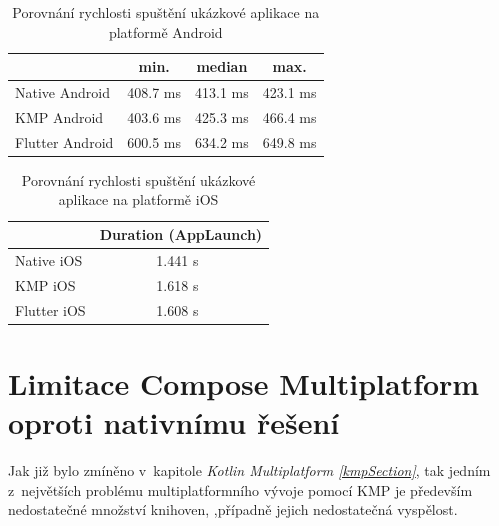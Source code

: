 \begin{table}[H]
  \centering
  \caption{Porovnání rychlosti spuštění ukázkové aplikace na platformě Android}
  \begin{tabular}{|l|c|c|c|}
    \hline
       & min. & median & max. \\ \hline 
      Native Android & 408.7 ms & 413.1 ms & 423.1 ms \\
      KMP Android & 403.6 ms & 425.3 ms & 466.4 ms \\
      Flutter Android & 600.5 ms & 634.2 ms & 649.8 ms \\ \hline
  \end{tabular}
  \label{tab:performance_comparison}
\end{table}

\begin{table}[H]
  \centering
  \caption{Porovnání rychlosti spuštění ukázkové aplikace na platformě iOS}
  \begin{tabular}{|l|c|}
      \hline
       & Duration (AppLaunch) \\
      \hline
      Native iOS & 1.441 s~\\
      KMP iOS & 1.618 s~\\
      Flutter iOS & 1.608 s~\\
      \hline
  \end{tabular}
  \label{tab:app_launch_duration_ios}
\end{table}





\section{Limitace Compose Multiplatform oproti nativnímu řešení} 
Jak již bylo zmíněno v~kapitole \textit{Kotlin Multiplatform \ref{kmpSection}}, tak jedním z~největších problému multiplatformního vývoje pomocí KMP je
především nedostatečné množství knihoven, ,případně jejich nedostatečná vyspělost. 

